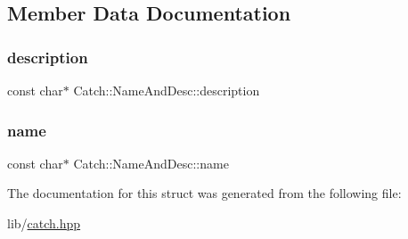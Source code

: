 \subsection{Member Data Documentation}
\hypertarget{struct_catch_1_1_name_and_desc_a3463a23ff65ce494fc380452b57b7970}{}\label{struct_catch_1_1_name_and_desc_a3463a23ff65ce494fc380452b57b7970} 
\subsubsection{\texorpdfstring{description}{description}}
{\footnotesize\ttfamily const char$\ast$ Catch\+::\+Name\+And\+Desc\+::description}

\hypertarget{struct_catch_1_1_name_and_desc_a374b4ed8be3cf98be20ebde5273bde51}{}\label{struct_catch_1_1_name_and_desc_a374b4ed8be3cf98be20ebde5273bde51} 
\subsubsection{\texorpdfstring{name}{name}}
{\footnotesize\ttfamily const char$\ast$ Catch\+::\+Name\+And\+Desc\+::name}



The documentation for this struct was generated from the following file\+:\begin{DoxyCompactItemize}
\item 
lib/\hyperlink{catch_8hpp}{catch.\+hpp}\end{DoxyCompactItemize}

